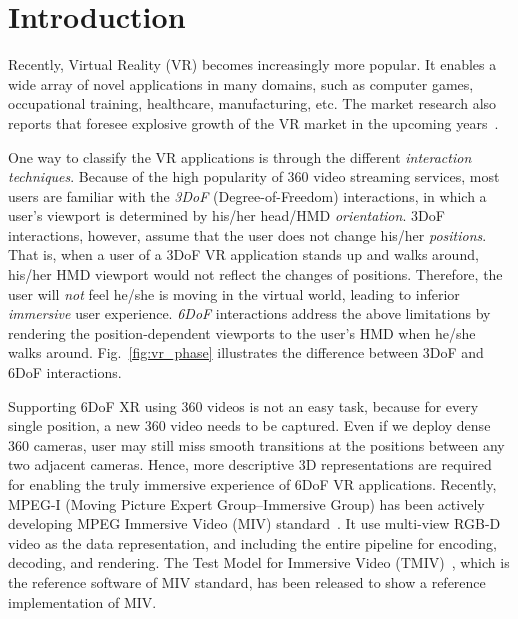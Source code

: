 \section{Introduction} \label{sec:intro}

Recently, Virtual Reality (VR) becomes increasingly more popular. It enables a wide array of novel applications in many domains, such as computer games, occupational training, healthcare, manufacturing, etc. The market research also reports that foresee explosive growth of the VR market in the upcoming years~\cite{XR_market}.

One way to classify the VR applications is through the different {\em interaction techniques}. Because of the high popularity of 360{\degree} video streaming services, most users are familiar with the {\em 3DoF} (Degree-of-Freedom) interactions, in which a user's viewport is determined by his/her head/HMD {\em orientation}. 3DoF interactions, however, assume that the user does not change his/her {\em positions}. That is, when a user of a 3DoF VR application stands up and walks around, his/her HMD viewport would not reflect the changes of positions. Therefore, the user will {\em not} feel he/she is moving in the virtual world, leading to inferior {\em immersive} user experience. {\em 6DoF} interactions address the above limitations by rendering  the position-dependent viewports to the user's HMD when he/she walks around. Fig.~\ref{fig:vr_phase} illustrates the difference between 3DoF and 6DoF interactions.


Supporting 6DoF XR using 360{\degree} videos is not an easy task, because for every single position, a new 360{\degree} video needs to be captured. Even if we deploy dense 360{\degree} cameras, user may still miss smooth transitions at the positions between any two adjacent cameras. Hence, more descriptive 3D representations are required for enabling the truly immersive experience of 6DoF VR applications. Recently, MPEG-I (Moving Picture Expert Group--Immersive Group) has been actively developing MPEG Immersive Video (MIV) standard~\cite{BDDF+21, MPEG_MIV_web}. It use multi-view RGB-D video as the data representation, and including the entire pipeline for encoding, decoding, and rendering. The Test Model for Immersive Video (TMIV)~\cite{tmiv_doc,tmiv_gitlab}, which is the reference software of MIV standard, has been released to show a reference implementation of MIV.

